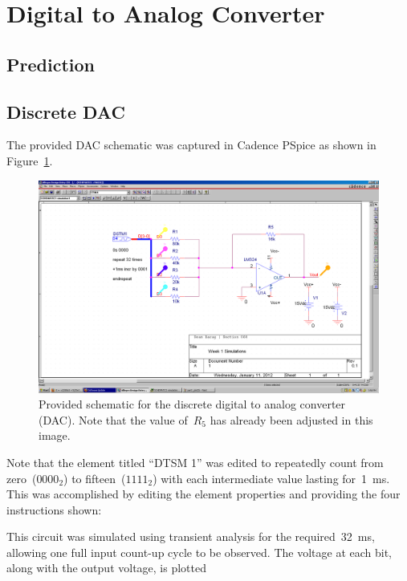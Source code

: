 \section{Digital to Analog Converter}
\subsection{Prediction}

\subsection{Discrete DAC}
The provided DAC schematic was captured in Cadence PSpice as shown in
Figure~\ref{f:dac_schem}.
%
\begin{figure}[H]
\centering
	\includegraphics[width=.8\textwidth]{img/shot/part1_schem.PNG}
	\parbox{.8\textwidth}{
	\caption[Discrete DAC --- Schematic]{Provided schematic for the discrete
	digital to analog converter (DAC).  Note that the value of~$R_5$ has
	already been adjusted in this image.}
	\label{f:dac_schem}}
\end{figure}
%
Note that the element titled ``DTSM 1'' was edited to repeatedly count from
zero~($0000_2$) to fifteen~($1111_2$) with each intermediate value
lasting for~\SI{1}{\milli\second}.  This was accomplished by editing the
element properties and providing the four instructions shown:
%
\begin{itemize*}
	\item {}
	\item {}
	\item {}
	\item {}
\end{itemize*}
%
This circuit was simulated using transient analysis for the
required~\SI{32}{\milli\second}, allowing one full input count-up cycle to be
observed.  The voltage at each bit, along with the output voltage, is plotted
